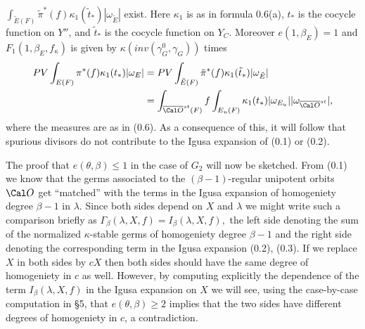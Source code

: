 $\int_{\tilde{E}(F)}\tilde{\pi}^*(f)\kappa_1(\tilde{t}_*) |\omega_{\tilde{E}}|$
exist. Here $\kappa_1$ is as in formula 0.6(a), $t_*$ is the
cocycle function on $Y''$, and $\tilde{t}_*$ is the cocycle function
on $Y_C$. Moreover $e(1,\beta_E)=1$ and
$F_1(1,\beta_E,f_\kappa)$ is given 
by $\kappa(inv(\gamma_G^0,\gamma_G))$ times
$$
\split
PV\int_{{E}(F)}\pi^*(f)\kappa_1(t_*) |\omega_{{E}}|
&=PV\int_{\tilde{E}(F)}\tilde{\pi}^*(f)
\kappa_1(\tilde{t}_*) |\omega_{\tilde{E}}|\\
&=\int_{\overline{\Cal O}^{st}(F)}
f\int_{{E}_u(F)}\kappa_1(t_*)|\omega_{{E}_u}|
|\omega_{\overline{\Cal O}^{st}}|,
\endsplit
$$
where the measures are as in (0.6).
\endproclaim
As a consequence of this, it will follow that
spurious divisors do not contribute to the Igusa
expansion of (0.1) or (0.2).

The proof that $e(\theta,\beta)\leq 1$ in the case of
$G_2$ will now be sketched. From (0.1) we know that the
germs associated to the
$(\beta -1)$-regular unipotent orbits ${\Cal O}$ get
``matched'' with the terms in the Igusa expansion of
homogeniety degree $\beta -1$ in $\lambda$. Since both sides depend
on $X$ and $\lambda$ we might write such a comparison briefly
as
$
\Gamma_\beta (\lambda,X,f)=I_\beta(\lambda,X,f),
$
the left side denoting the sum of the normalized $\kappa$-stable
germs of homogeniety degree $\beta -1$ and the right side
denoting the corresponding term in the Igusa expansion
(0.2), (0.3). If we replace $X$ in both sides by $cX$ then both sides
should have the same degree of homogeniety in $c$ as well. However,
by computing explicitly the dependence of the term $I_\beta(\lambda,X,f)$
in the Igusa expansion on $X$ we will see, using the case-by-case
computation in \S 5, that $e(\theta,\beta)\geq 2$ implies that the two sides
have different degrees of homogeniety in $c$, a contradiction.

